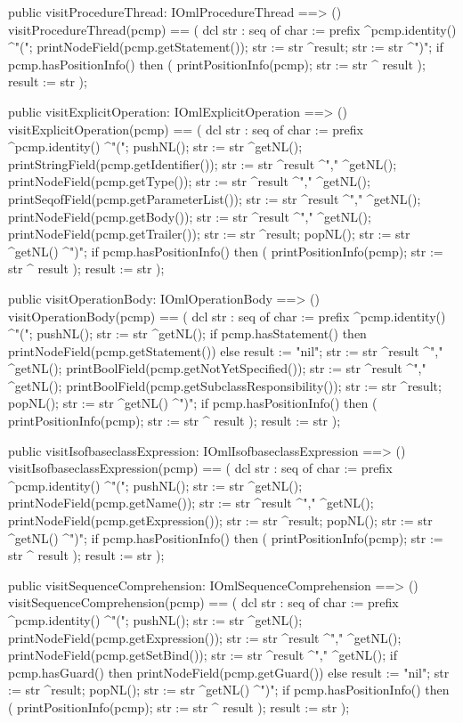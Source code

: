 \begin{vdm_al}
  public visitProcedureThread: IOmlProcedureThread ==> ()
  visitProcedureThread(pcmp) ==
    ( dcl str : seq of char := prefix ^pcmp.identity() ^"(";
      printNodeField(pcmp.getStatement());
      str := str ^result;
      str := str ^")";
      if pcmp.hasPositionInfo()
      then ( printPositionInfo(pcmp);
             str := str ^ result );
      result := str );

  public visitExplicitOperation: IOmlExplicitOperation ==> ()
  visitExplicitOperation(pcmp) ==
    ( dcl str : seq of char := prefix ^pcmp.identity() ^"(";
      pushNL();
      str := str ^getNL();
      printStringField(pcmp.getIdentifier());
      str := str ^result ^"," ^getNL();
      printNodeField(pcmp.getType());
      str := str ^result ^"," ^getNL();
      printSeqofField(pcmp.getParameterList());
      str := str ^result ^"," ^getNL();
      printNodeField(pcmp.getBody());
      str := str ^result ^"," ^getNL();
      printNodeField(pcmp.getTrailer());
      str := str ^result;
      popNL();
      str := str ^getNL() ^")";
      if pcmp.hasPositionInfo()
      then ( printPositionInfo(pcmp);
             str := str ^ result );
      result := str );

  public visitOperationBody: IOmlOperationBody ==> ()
  visitOperationBody(pcmp) ==
    ( dcl str : seq of char := prefix ^pcmp.identity() ^"(";
      pushNL();
      str := str ^getNL();
      if pcmp.hasStatement()
      then printNodeField(pcmp.getStatement())
      else result := "nil";
      str := str ^result ^"," ^getNL();
      printBoolField(pcmp.getNotYetSpecified());
      str := str ^result ^"," ^getNL();
      printBoolField(pcmp.getSubclassResponsibility());
      str := str ^result;
      popNL();
      str := str ^getNL() ^")";
      if pcmp.hasPositionInfo()
      then ( printPositionInfo(pcmp);
             str := str ^ result );
      result := str );

  public visitIsofbaseclassExpression: IOmlIsofbaseclassExpression ==> ()
  visitIsofbaseclassExpression(pcmp) ==
    ( dcl str : seq of char := prefix ^pcmp.identity() ^"(";
      pushNL();
      str := str ^getNL();
      printNodeField(pcmp.getName());
      str := str ^result ^"," ^getNL();
      printNodeField(pcmp.getExpression());
      str := str ^result;
      popNL();
      str := str ^getNL() ^")";
      if pcmp.hasPositionInfo()
      then ( printPositionInfo(pcmp);
             str := str ^ result );
      result := str );

  public visitSequenceComprehension: IOmlSequenceComprehension ==> ()
  visitSequenceComprehension(pcmp) ==
    ( dcl str : seq of char := prefix ^pcmp.identity() ^"(";
      pushNL();
      str := str ^getNL();
      printNodeField(pcmp.getExpression());
      str := str ^result ^"," ^getNL();
      printNodeField(pcmp.getSetBind());
      str := str ^result ^"," ^getNL();
      if pcmp.hasGuard()
      then printNodeField(pcmp.getGuard())
      else result := "nil";
      str := str ^result;
      popNL();
      str := str ^getNL() ^")";
      if pcmp.hasPositionInfo()
      then ( printPositionInfo(pcmp);
             str := str ^ result );
      result := str );


\end{vdm_al}
